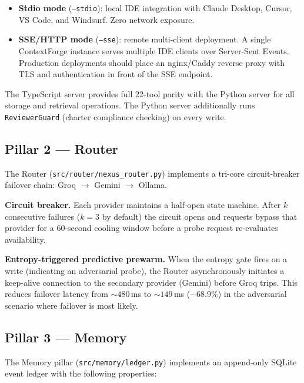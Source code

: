 \documentclass[11pt]{article}
\begin{document}
\begin{itemize}
  \item \textbf{Stdio mode} (\texttt{--stdio}): local IDE integration with
    Claude Desktop, Cursor, VS Code, and Windsurf. Zero network exposure.
  \item \textbf{SSE/HTTP mode} (\texttt{--sse}): remote multi-client deployment.
    A single ContextForge instance serves multiple IDE clients over Server-Sent
    Events. Production deployments should place an nginx/Caddy reverse proxy
    with TLS and authentication in front of the SSE endpoint.
\end{itemize}

The TypeScript server provides full 22-tool parity with the Python server for
all storage and retrieval operations. The Python server additionally runs
\texttt{ReviewerGuard} (charter compliance checking) on every write.

\subsection{Pillar 2 --- Router}
\label{sec:router}

The Router (\texttt{src/router/nexus\_router.py}) implements a tri-core
circuit-breaker failover chain: Groq $\to$ Gemini $\to$ Ollama.

\textbf{Circuit breaker.} Each provider maintains a half-open state machine.
After $k$ consecutive failures ($k = 3$ by default) the circuit opens and
requests bypass that provider for a 60-second cooling window before a probe
request re-evaluates availability.

\textbf{Entropy-triggered predictive prewarm.} When the entropy gate fires on
a write (indicating an adversarial probe), the Router asynchronously initiates
a keep-alive connection to the secondary provider (Gemini) before Groq trips.
This reduces failover latency from ${\sim}480$\,ms to ${\sim}149$\,ms
($-68.9\%$) in the adversarial scenario where failover is most likely.

\subsection{Pillar 3 --- Memory}
\label{sec:memory}

The Memory pillar (\texttt{src/memory/ledger.py}) implements an append-only
SQLite event ledger with the following properties:
\end{document}
